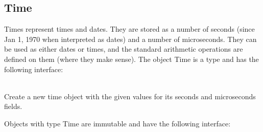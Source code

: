 \subsection{Time}
\label{builtin Time}
Times represent times and dates.  They are stored as a number of
seconds (since Jan 1, 1970 when interpreted as dates) and a number of
microseconds.  They can be 
used as either dates or times, and the standard arithmetic operations
are defined on them (where they make sense).  The object Time is a type
and has the following interface: 

\begin{desc}
  \item[\kw{operation} create\/\LB{}seconds \CO{} \tn{Integer}, microseconds \CO{} \tn{Integer}\/\RB{} \returns{} \/\LB{}Time\/\RB{}]~\\
    Create a new time object with the given values for its seconds and
    microseconds fields.
\end{desc}
    
\noindent Objects with type Time are immutable and have the following
interface:

